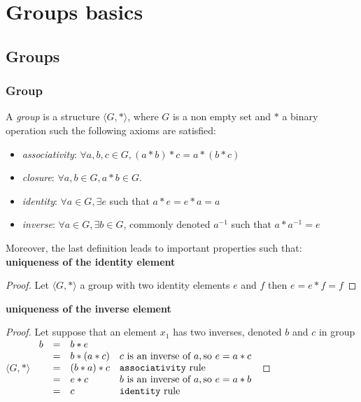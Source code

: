\clearpage
\section{Groups basics}

\subsection{Groups}

\subsubsection{Group}

A \emph{group} is a structure $\langle G, * \rangle$, where $G$ is a non empty set and $*$ a binary
operation such the following axioms are satisfied:
\begin{itemize}
	\item \emph{associativity}: $\forall a, b, c \in G, (a * b) * c = a * (b * c)$
	\item \emph{closure}: $\forall a, b \in G, a * b \in G$.
	\item \emph{identity}: $\forall a \in G, \exists e$ such that $ a * e = e * a = a$
	\item \emph{inverse}:  $\forall a \in G, \exists b \in G$, commonly denoted $a^{-1}$ such that $a * a^{-1} = e$
\end{itemize}

Moreover, the last definition leads to important properties such that: \\
\textbullet	\quad \textbf{uniqueness of the identity element}
\begin{proof}
	Let $\langle G, * \rangle$ a group with two identity elements $e$ and $f$ then 
	$ e = e * f = f$
\end{proof}
\textbullet \quad \textbf{uniqueness of the inverse element}
\begin{proof}
	Let suppose that an element $x_1$ has two inverses, denoted $b$ and $c$ in group $\langle G, * \rangle$
	$\begin{array}{lcll}					
		b & = & b * e & \\
		  & = & b * (a * c) & c \text{ is an inverse of } a, \text{so } e = a * c\\
		  & = & (b * a) * c &   \text{\texttt{associativity} rule}\\
		  & = & e * c       & b \text{ is an inverse of } a, \text{so } e = a * b\\
		  & = & c           &   \text{\texttt{identity} rule}
	\end{array}$
\end{proof}


